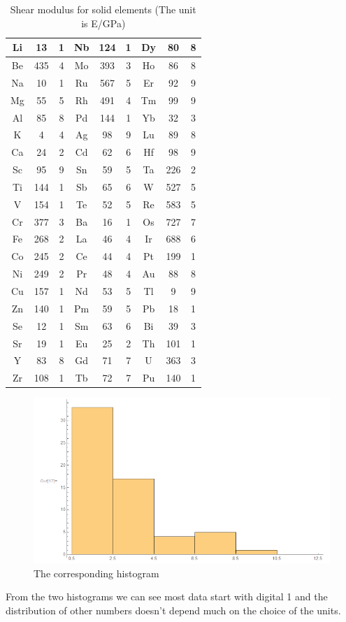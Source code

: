 \documentclass[12pt]{article}
\begin{document}
\begin{table}[H]
\centering
\caption{Shear modulus for solid elements (The unit is E/GPa)}
\begin{tabular}{|c|c|c|c|c|c|c|c|c|}
\hline
Li & 13  & 1 & Nb & 124 & 1 & Dy & 80  & 8 \\ \hline
Be & 435 & 4 & Mo & 393 & 3 & Ho & 86  & 8 \\ \hline
Na & 10  & 1 & Ru & 567 & 5 & Er & 92  & 9 \\ \hline
Mg & 55  & 5 & Rh & 491 & 4 & Tm & 99  & 9 \\ \hline
Al & 85  & 8 & Pd & 144 & 1 & Yb & 32  & 3 \\ \hline
K  & 4   & 4 & Ag & 98  & 9 & Lu & 89  & 8 \\ \hline
Ca & 24  & 2 & Cd & 62  & 6 & Hf & 98  & 9 \\ \hline
Sc & 95  & 9 & Sn & 59  & 5 & Ta & 226 & 2 \\ \hline
Ti & 144 & 1 & Sb & 65  & 6 & W  & 527 & 5 \\ \hline
V  & 154 & 1 & Te & 52  & 5 & Re & 583 & 5 \\ \hline
Cr & 377 & 3 & Ba & 16  & 1 & Os & 727 & 7 \\ \hline
Fe & 268 & 2 & La & 46  & 4 & Ir & 688 & 6 \\ \hline
Co & 245 & 2 & Ce & 44  & 4 & Pt & 199 & 1 \\ \hline
Ni & 249 & 2 & Pr & 48  & 4 & Au & 88  & 8 \\ \hline
Cu & 157 & 1 & Nd & 53  & 5 & Tl & 9   & 9 \\ \hline
Zn & 140 & 1 & Pm & 59  & 5 & Pb & 18  & 1 \\ \hline
Se & 12  & 1 & Sm & 63  & 6 & Bi & 39  & 3 \\ \hline
Sr & 19  & 1 & Eu & 25  & 2 & Th & 101 & 1 \\ \hline
Y  & 83  & 8 & Gd & 71  & 7 & U  & 363 & 3 \\ \hline
Zr & 108 & 1 & Tb & 72  & 7 & Pu & 140 & 1 \\ \hline
\end{tabular}
\end{table}
\begin{figure}[H]
\centering
\includegraphics[scale=0.4]{P1.png}
\caption{The corresponding histogram}
\end{figure}
From the two histograms we can see most data start with digital 1 and the distribution of other numbers doesn't depend much on the choice of the units.
\end{document}
